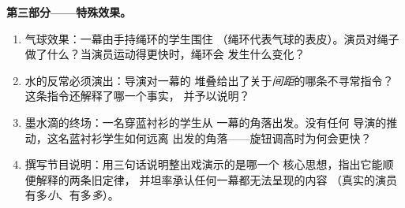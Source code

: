 \begin{problem}
\medskip\noindent\textbf{第三部分——特殊效果。}
\begin{enumerate}[resume]
  \item 气球效果：一幕由手持绳环的学生围住
        （绳环代表气球的表皮）。演员对绳子
        做了什么？当演员运动得更快时，绳环会
        发生什么变化？
  \item 水的反常必须演出：导演对一幕的
        堆叠给出了关于\emph{间距}的哪条不寻常指令？
        这条指令还解释了哪一个事实，
        并予以说明？
  \item 墨水滴的终场：一名穿蓝衬衫的学生从
        \emph{}一幕的角落出发。没有任何
        导演的推动，这名蓝衬衫学生如何远离
        出发的角落——旋钮调高时为何会更快？
  \item 撰写节目说明：用三句话说明整出戏演示的是哪一个
        核心思想，指出它能顺便解释的两条旧定律，
        并坦率承认任何一幕都无法呈现的内容
        （真实的演员
        有多\emph{小}、有多\emph{多}）。
\end{enumerate}
\end{problem}
